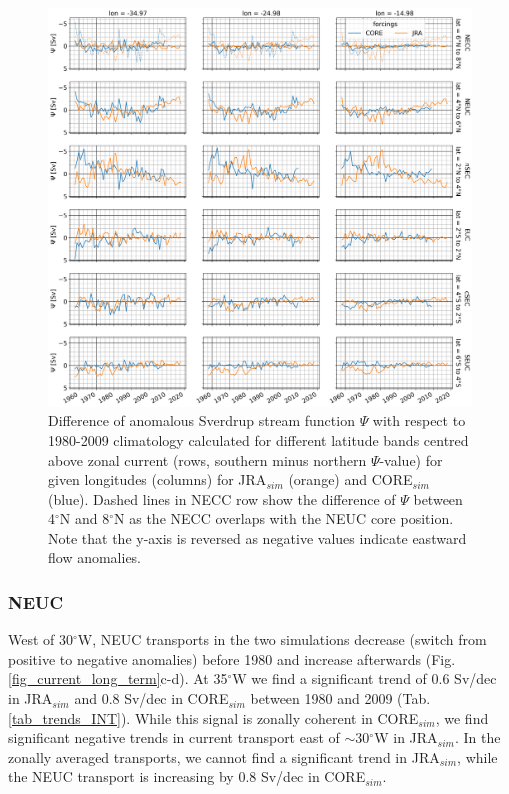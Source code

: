 \documentclass[os, manuscript]{copernicus}
\begin{document}
	
	\begin{figure}[t]
		\includegraphics[width=12cm]{../../figures/paper/f11_INALT20_Sv_psi_ts_lat_bands.png}
		\caption{Difference of anomalous Sverdrup stream function $ \Psi $ with respect to 1980-2009 climatology calculated for different latitude bands centred above zonal current (rows, southern minus northern $ \Psi $-value) for given longitudes (columns) for JRA$_{sim}$ (orange) and CORE$_{sim}$ (blue). Dashed lines in NECC row show the difference of $ \Psi $ between 4$^{\circ}$N and 8$^{\circ}$N as the NECC overlaps with the NEUC core position. Note that the y-axis is reversed as negative values indicate eastward flow anomalies.}
		\label{fig_SV_PSI_diff_ts_long_term}
	\end{figure}
	
	\subsubsection{NEUC}
	West of 30$^{\circ}$W, NEUC transports in the two simulations decrease (switch from positive to negative anomalies) before 1980 and increase afterwards (Fig. \ref{fig_current_long_term}c-d). At 35$^{\circ}$W we find a significant trend of 0.6 Sv/dec in JRA$_{sim}$ and 0.8 Sv/dec in CORE$_{sim}$ between 1980 and 2009 (Tab. \ref{tab_trends_INT}). While this signal is zonally coherent in CORE$_{sim}$, we find significant negative trends in current transport east of $\sim$30$^{\circ}$W in JRA$_{sim}$. In the zonally averaged transports, we cannot find a significant trend in JRA$_{sim}$, while the NEUC transport is increasing by 0.8 Sv/dec in CORE$_{sim}$.
	
\end{document}
